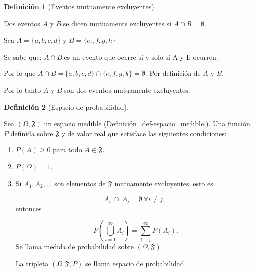 \documentclass[
  us-letterpaper,
]{scrreprt}
\theoremstyle{plain}
\theoremstyle{plain}
\theoremstyle{definition}
\newtheorem{definition}{Definición}[chapter]
\theoremstyle{remark}
\begin{document}
\begin{definition}[Eventos mutuamente
excluyentes]\protect\hypertarget{def-mutuamente_excluyentes}{}\label{def-mutuamente_excluyentes}

Dos eventos \(A\) y \(B\) se dicen mutuamente excluyentes si
\(A \cap B = \emptyset\).

\end{definition}

\begin{tcolorbox}[enhanced jigsaw, titlerule=0mm, opacityback=0, coltitle=black, bottomrule=.15mm, colbacktitle=quarto-callout-caution-color!10!white, toprule=.15mm, colback=white, arc=.35mm, colframe=quarto-callout-caution-color-frame, leftrule=.75mm, bottomtitle=1mm, left=2mm, toptitle=1mm, opacitybacktitle=0.6, breakable, title={Ejemplo (\textbf{\emph{Eventos mutuamente excluyentes}})}, rightrule=.15mm]

Sea \(A= \{a,b,c,d\}\) y \(B = \{e.,f,g,h\}\)

Se sabe que: \(A \cap B\) es un evento que ocurre si y solo si A y B
ocurren.

Por lo que \(A \cap B = \{a,b,c,d\} \cap \{e,f,g,h\} = \emptyset\). Por
definición de \(A\) y \(B\).

Por lo tanto \(A\) y \(B\) son dos eventos mutuamente excluyentes.

\end{tcolorbox}

\begin{definition}[Espacio de
probabilidad]\protect\hypertarget{def-espacio_probabilidad}{}\label{def-espacio_probabilidad}

Sea \((\Omega, \mathfrak{F})\) un espacio medible
(Definición~\ref{def-espacio_medible}). Una función \(P\) definida sobre
\(\mathfrak{F}\) y de valor real que satisface las siguientes
condiciones:

\begin{enumerate}
\def\labelenumi{\roman{enumi}.}
\item
  \(P(A) \geq 0\) para todo \(A \in \mathfrak{F}\).
\item
  \(P(\Omega) = 1\).
\item
  Si \(A_1, A_2, ...\) son elementos de \(\mathfrak{F}\) mutuamente
  excluyentes, esto es

  \[
  A_i \ \cap \ A_j = \emptyset \  \forall i \neq j, 
  \] entonces

  \[\ P \left( \bigcup_{i=1}^{\infty} A_i\right) = \sum_{i=1}^{\infty} P(A_i).
  \]Se llama medida de probabilidad sobre \((\Omega, \mathfrak{F})\).

  La tripleta \((\Omega, \mathfrak{F}, P)\) se llama espacio de
  probabilidad.
\end{enumerate}

\end{definition}
\end{document}
